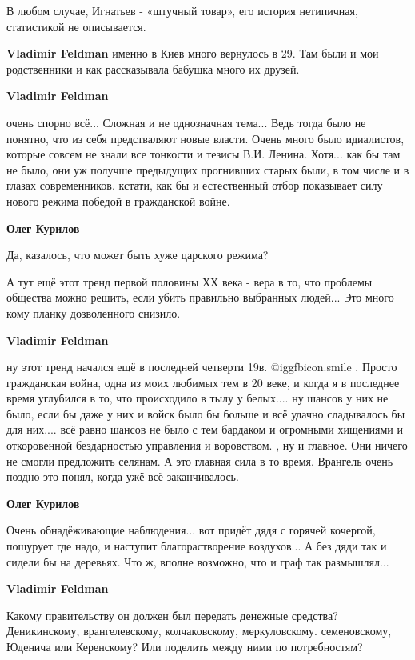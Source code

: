 \begin{itemize}
\begin{itemize}
\begin{itemize}
В любом случае, Игнатьев - «штучный товар», его история нетипичная, статистикой
не описывается.

\textbf{Vladimir Feldman} именно в Киев много вернулось в 29. Там были и мои родственники и как рассказывала бабушка много их друзей.
\end{itemize} %

\textbf{Vladimir Feldman} 

очень спорно всё... Сложная и не однозначная тема... Ведь тогда было не
понятно, что из себя предстваляют новые власти. Очень много было идиалистов,
которые совсем не знали все тонкости и тезисы В.И. Ленина. Хотя... как бы там
не было, они уж получше предыдущих прогнивших старых были, в том числе и в
глазах современников. кстати, как бы и естественный отбор показывает силу
нового режима победой в гражданской войне.

\begin{itemize} %
\textbf{Олег Курилов} 

Да, казалось, что может быть хуже царского режима?

А тут ещё этот тренд первой половины ХХ века - вера в то, что проблемы общества
можно решить, если убить правильно выбранных людей... Это много кому планку
дозволенного снизило.

\textbf{Vladimir Feldman} 

ну этот тренд начался ещё в последней четверти 19в.  @igg{fbicon.smile} .
Просто гражданская война, одна из моих любимых тем в 20 веке, и когда я в
последнее время углубился в то, что происходило в тылу у белых.... ну шансов у
них не было, если бы даже у них и войск было бы больше и всё удачно сладывалось
бы для них.... всё равно шансов не было с тем бардаком и огромными хищениями и
откоровенной бездарностью управления и воровством. , ну и главное. Они ничего
не смогли предложить селянам. А это главная сила в то время. Врангель очень
поздно это понял, когда ужё всё заканчивалось.

\textbf{Олег Курилов} 

Очень обнадёживающие наблюдения... вот придёт дядя с горячей кочергой, пошурует
где надо, и наступит благорастворение воздухов... А без дяди так и сидели бы на
деревьях. Что ж, вполне возможно, что и граф так размышлял...

\end{itemize} %

\textbf{Vladimir Feldman} 

Какому правительству он должен был передать денежные средства? Деникинскому,
врангелевскому, колчаковскому, меркуловскому. семеновскому, Юденича или
Керенскому? Или поделить между ними по потребностям?

\end{itemize} %

\end{itemize} %
